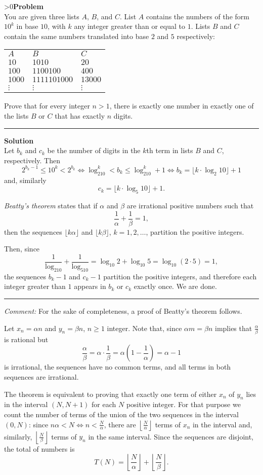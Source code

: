 \documentclass[12pt,oneside,a4paper]{book}
\newcounter{probnum}
\newcounter{solnum}
\newcommand{\prob}{\ifnum\value{probnum}>0\newpage\fi\setcounter{solnum}{0}\stepcounter{probnum}\textbf{Problem \theprobnum}\\}
\newcommand{\comment}{\medskip\hrule\medbreak\emph{Comment: }}
\newcommand{\sol}{\medskip\hrule\medbreak\textbf{Solution}\\}
\begin{document}
\prob You are given three lists $A$, $B$, and $C$. List $A$ contains the numbers of the form $10^k$ in base $10$, with $k$ any integer greater than or equal to $1$. Lists $B$ and $C$ contain the same numbers translated into base $2$ and $5$ respectively:
\begin{center}
\begin{tabular}{lll}
$A$& $B$& $C$\\
$10$& $1010$& $20$\\
$100$& $1100100$& $400$\\
$1000$& $1111101000$& $13000$\\
$\vdots$& $\vdots$& $\vdots$
\end{tabular}
\end{center}

Prove that for every integer $n>1$, there is exactly one number in exactly one of the lists $B$ or $C$ that has exactly $n$ digits.

\sol
Let $b_k$ and $c_k$ be the number of digits in the $k$th term in lists $B$ and $C$, respectively. Then
\[2^{b_k-1} \le 10^k < 2^{b_k}\iff \log_210^k < b_k \le \log_210^k+1\iff b_k = \lfloor k\cdot\log_2 10\rfloor + 1\]
and, similarly
\[c_k = \lfloor k\cdot\log_5 10\rfloor + 1.\]

\emph{Beatty's theorem} states that if $\alpha$ and $\beta$ are irrational positive numbers such that
\[\frac1\alpha + \frac1\beta=1,\]
then the sequences $\lfloor k\alpha\rfloor$ and $\lfloor k\beta\rfloor$, $k=1,2,\ldots$, partition the positive integers.

Then, since
\[\frac1{\log_210} + \frac1{\log_510} = \log_{10}2 + \log_{10}5 = \log_{10}(2\cdot 5) = 1,\]
the sequences $b_k-1$ and $c_k-1$ partition the positive integers, and therefore each integer greater than $1$ appears in $b_k$ or $c_k$ exactly once. We are done.

\comment For the sake of completeness, a proof of Beatty's theorem follows.

Let $x_n = \alpha n$ and $y_n = \beta n$, $n\ge 1$ integer. Note that, since $\alpha m = \beta n$ implies that $\frac\alpha\beta$ is rational but
\[\frac\alpha\beta = \alpha \cdot \frac1\beta = \alpha\left(1-\frac1\alpha\right) = \alpha - 1\]
is irrational, the sequences have no common terms, and all terms in both sequences are irrational.

The theorem is equivalent to proving that exactly one term of either $x_n$ of $y_n$ lies in the interval $(N,N+1)$ for each $N$ positive integer. For that purpose we count the number of terms of the union of the two sequences in the interval $(0,N)$: since $n\alpha < N\iff n < \frac N\alpha$, there are $\left\lfloor\frac N\alpha\right\rfloor$ terms of $x_n$ in the interval and, similarly, $\left\lfloor\frac N\beta\right\rfloor$ terms of $y_n$ in the same interval. Since the sequences are disjoint, the total of numbers is
\[T(N) = \left\lfloor\frac N\alpha\right\rfloor + \left\lfloor\frac N\beta\right\rfloor.\]
\end{document}
